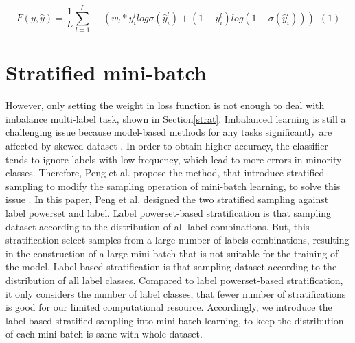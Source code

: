 \[
   F(y, \hat{y}) = \frac{1}{L}\sum_{l=1}^{L}-(w_l*y_i^llog\sigma(\hat{y}_i^l)+(1-y_i^l)log(1-\sigma(\hat{y}_i^l)))\ \ (1)
\]

\section{Stratified mini-batch}
However, only setting the weight in loss function is not enough to deal with imbalance multi-label task, shown in Section\ref{strat}. Imbalanced learning is still a challenging issue because model-based methods for any tasks significantly are affected by skewed dataset \cite{buda2018systematic}. In order to obtain higher accuracy, the classifier tends to ignore labels with low frequency, which lead to more errors in minority classes. Therefore, Peng et al. propose the method, that introduce stratified sampling to modify the sampling operation of mini-batch learning, to solve this issue \cite{peng2021addressing}. In this paper, Peng et al. designed the two stratified sampling against label powerset and label. Label powerset-based stratification is that sampling dataset according to the distribution of all label combinations. But, this stratification select samples from a large number of labels combinations, resulting in the construction of a large mini-batch that is not suitable for the training of the model. Label-based stratification is that sampling dataset according to the distribution of all label classes. Compared to label powerset-based stratification, it only considers the number of label classes, that fewer number of stratifications is good for our limited computational resource. Accordingly, we introduce the label-based stratified sampling into mini-batch learning, to keep the distribution of each mini-batch is same with whole dataset.
